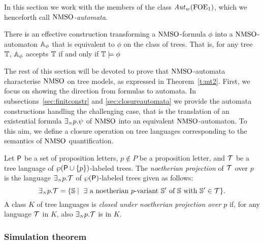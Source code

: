 In this section we work with the members of the class $\mathit{Aut}_{w}(\mathrm{FOE}_1)$, which we henceforth call \emph{$\mathrm{NMSO}$-automata}.


\begin{theorem}
\label{t:nmsoauto}
There is an effective construction transforming a $\mathrm{NMSO}$-formula $\phi$
into a $\mathrm{NMSO}$-automaton $\mathbb{A}_{\phi}$ that is equivalent
to $\phi$ on the class of trees.
That is, for any tree $\mathbb{T}$, $\mathbb{A}_{\phi}$ accepts $\mathbb{T}$ if and only if $\mathbb{T} \models {\phi}$
\end{theorem}

The rest of this section will be devoted to prove that $\mathrm{NMSO}$-automata
characterise $\mathrm{NMSO}$ on tree models, as expressed in Theorem~\ref{t:mt2}.
First, we focus on showing the direction from formulas to automata.
In subsections~\ref{sec:finitconstr} and \ref{sec:closureautomata} we provide
the automata constructions handling the challenging case, that is the
translation of an existential formula $\exists_{{\scriptscriptstyle N}} p.\psi$ of $\mathrm{NMSO}$ into an
equivalent $\mathrm{NMSO}$-automaton.
To this aim, we define a closure operation on tree languages corresponding
to the semantics of $\mathrm{NMSO}$ quantification.

\begin{definition}\label{def:tree_finproj}
Let $\mathsf{P}$ be a set of proposition letters, $p \not\in P$ be a proposition letter, and $\mathcal{T}$ be a tree language of $\wp (\mathsf{P}\cup\{p\})$-labeled
trees.
The \emph{noetherian projection} of $\mathcal{T}$ over $p$ is the language
$\exists_{{\scriptscriptstyle N}} p.\mathcal{T}$ of $\wp (\mathsf{P})$-labeled trees %
given as follows:
%
$$
\noetexists p.\trees = \{\model \mid \text{ $\exists$ a noetherian $p$-variant } \model' \text{ of } \model \text{ with } \model' \in \trees\}.
$$
%
A class $K$ of tree languages is \emph{closed under noetherian projection
over $p$} if, for any language $\mathcal{T}$ in $K$, also ${\exists_{{\scriptscriptstyle N}} p}.\mathcal{T}$ is in $K$.
\end{definition} 

\subsubsection{Simulation theorem}


